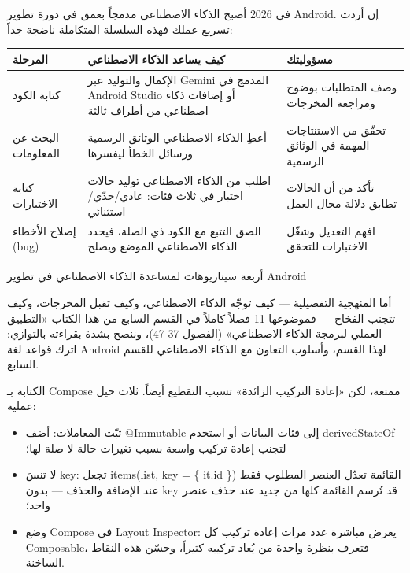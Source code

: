 
في 2026 أصبح الذكاء الاصطناعي مدمجاً بعمق في دورة تطوير Android. إن أردت تسريع عملك فهذه السلسلة المتكاملة ناضجة جداً:

\begin{center}
\begin{tabularx}{\linewidth}{|X|X|X|}
\hline
\textbf{المرحلة} & \textbf{كيف يساعد الذكاء الاصطناعي} & \textbf{مسؤوليتك} \tabularnewline
\hline
كتابة الكود & الإكمال والتوليد عبر Gemini المدمج في Android Studio أو إضافات ذكاء اصطناعي من أطراف ثالثة & وصف المتطلبات بوضوح ومراجعة المخرجات \tabularnewline
البحث عن المعلومات & أعطِ الذكاء الاصطناعي الوثائق الرسمية ورسائل الخطأ ليفسرها & تحقّق من الاستنتاجات المهمة في الوثائق الرسمية \tabularnewline
كتابة الاختبارات & اطلب من الذكاء الاصطناعي توليد حالات اختبار في ثلاث فئات: عادي/حدّي/استثنائي & تأكد من أن الحالات تطابق دلالة مجال العمل \tabularnewline
إصلاح الأخطاء (bug) & الصق التتبع مع الكود ذي الصلة، فيحدد الذكاء الاصطناعي الموضع ويصلح & افهم التعديل وشغّل الاختبارات للتحقق \tabularnewline
\hline
\end{tabularx}
\end{center}

\begin{center}\small\color{gray}أربعة سيناريوهات لمساعدة الذكاء الاصطناعي في تطوير Android\end{center}

أما المنهجية التفصيلية — كيف توجّه الذكاء الاصطناعي، وكيف تقبل المخرجات، وكيف تتجنب الفخاخ — فموضوعها 11 فصلاً كاملاً في القسم السابع من هذا الكتاب «التطبيق العملي لبرمجة الذكاء الاصطناعي» (الفصول 37-47)، وننصح بشدة بقراءته بالتوازي: اترك قواعد لغة Android لهذا القسم، وأسلوب التعاون مع الذكاء الاصطناعي للقسم السابع.


الكتابة بـ Compose ممتعة، لكن «إعادة التركيب الزائدة» تسبب التقطيع أيضاً. ثلاث حيل عملية:

\begin{itemize}
  \item ثبّت المعاملات: أضف @Immutable إلى فئات البيانات أو استخدم derivedStateOf لتجنب إعادة تركيب واسعة بسبب تغيرات حالة لا صلة لها؛
  \item لا تنسَ key: تجعل items(list, key = \{ it.id \}) القائمة تعدّل العنصر المطلوب فقط عند الإضافة والحذف — بدون key قد تُرسم القائمة كلها من جديد عند حذف عنصر واحد؛
  \item وضع Compose في Layout Inspector: يعرض مباشرة عدد مرات إعادة تركيب كل Composable، فتعرف بنظرة واحدة من يُعاد تركيبه كثيراً، وحسّن هذه النقاط الساخنة.
\end{itemize}

